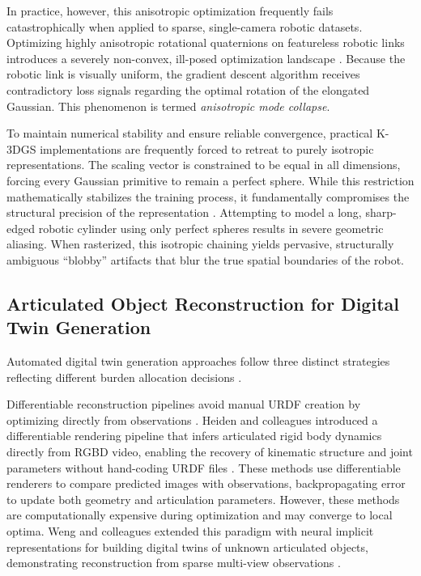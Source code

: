\documentclass[12pt,a4paper,oneside]{report}
\begin{document}
In practice, however, this anisotropic optimization frequently fails catastrophically when applied to sparse, single-camera robotic datasets. Optimizing highly anisotropic rotational quaternions on featureless robotic links introduces a severely non-convex, ill-posed optimization landscape \cite{hu2025learning}. Because the robotic link is visually uniform, the gradient descent algorithm receives contradictory loss signals regarding the optimal rotation of the elongated Gaussian. This phenomenon is termed \textit{anisotropic mode collapse}.

To maintain numerical stability and ensure reliable convergence, practical K-3DGS implementations are frequently forced to retreat to purely isotropic representations. The scaling vector is constrained to be equal in all dimensions, forcing every Gaussian primitive to remain a perfect sphere. While this restriction mathematically stabilizes the training process, it fundamentally compromises the structural precision of the representation \cite{hu2025learning}. Attempting to model a long, sharp-edged robotic cylinder using only perfect spheres results in severe geometric aliasing. When rasterized, this isotropic chaining yields pervasive, structurally ambiguous ``blobby'' artifacts that blur the true spatial boundaries of the robot.
\subsection{Articulated Object Reconstruction for Digital Twin Generation}
\label{subsec:articulated_object_reconstruction_for_digital_twin_generation}

Automated digital twin generation approaches follow three distinct strategies reflecting different burden allocation decisions \cite{heiden2022inferring, weng2024neural, li2025art}.

Differentiable reconstruction pipelines avoid manual URDF creation by optimizing directly from observations \cite{heiden2022inferring, weng2024neural}. Heiden and colleagues introduced a differentiable rendering pipeline that infers articulated rigid body dynamics directly from RGBD video, enabling the recovery of kinematic structure and joint parameters without hand-coding URDF files \cite{heiden2022inferring}. These methods use differentiable renderers to compare predicted images with observations, backpropagating error to update both geometry and articulation parameters. However, these methods are computationally expensive during optimization and may converge to local optima. Weng and colleagues extended this paradigm with neural implicit representations for building digital twins of unknown articulated objects, demonstrating reconstruction from sparse multi-view observations \cite{weng2024neural}.
\end{document}

